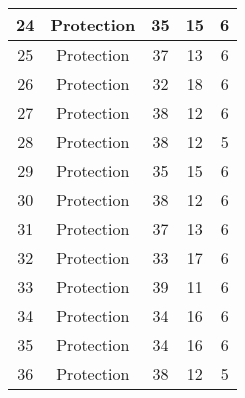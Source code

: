 \documentclass[results.tex]{subfiles}
\begin{document}
\begin{center}
\begin{tabular}{| c || c | c | c | c |}
            \hline
            24                      & Protection                   & 35                     & 15                      & 6                    \\
            \hline
            25                      & Protection                   & 37                     & 13                      & 6                    \\
            \hline
            26                      & Protection                   & 32                     & 18                      & 6                    \\
            \hline
            27                      & Protection                   & 38                     & 12                      & 6                    \\
            \hline
            28                      & Protection                   & 38                     & 12                      & 5                    \\
            \hline
            29                      & Protection                   & 35                     & 15                      & 6                    \\
            \hline
            30                      & Protection                   & 38                     & 12                      & 6                    \\
            \hline
            31                      & Protection                   & 37                     & 13                      & 6                    \\
            \hline
            32                      & Protection                   & 33                     & 17                      & 6                    \\
            \hline
            33                      & Protection                   & 39                     & 11                      & 6                    \\
            \hline
            34                      & Protection                   & 34                     & 16                      & 6                    \\
            \hline
            35                      & Protection                   & 34                     & 16                      & 6                    \\
            \hline
            36                      & Protection                   & 38                     & 12                      & 5                    \\

\end{tabular}
\end{center}
\end{document}
